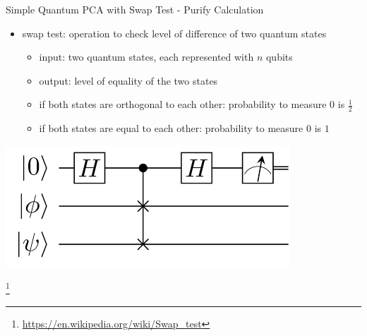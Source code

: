 \begin{frame}{Simple Quantum PCA with Swap Test - Purify Calculation}
  \begin{minipage}{0.5\textwidth}
    \begin{itemize}
      \item swap test: operation to check level of difference of two quantum states
      \begin{itemize}
        \item input: two quantum states, each represented with $n$ qubits
        \item output: level of equality of the two states
      \end{itemize}
      \begin{itemize}
        \item if both states are orthogonal to each other: probability to measure $0$ is $\frac{1}{2}$
        \item if both states are equal to each other: probability to measure $0$ is $1$
      \end{itemize}
    \end{itemize}
  \end{minipage}%
  \begin{minipage}{0.5\textwidth}
    \centering
    \includegraphics[width=0.8\textwidth]{../assets/wp_swap_test_simple.png}
  \end{minipage}
  \footnote{\url{https://en.wikipedia.org/wiki/Swap_test}}
\end{frame}


